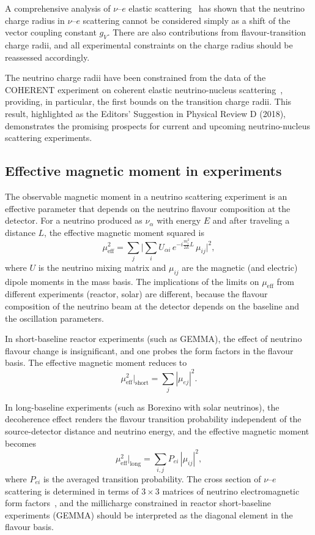 \documentclass[a4paper,11pt]{article}
\begin{document}
A comprehensive analysis of $\nu$--$e$ elastic scattering~\cite{Kouzakov:Studenikin:2017PRD} has shown that the neutrino charge radius in $\nu$--$e$ scattering cannot be considered simply as a shift of the vector coupling constant $g_V$. There are also contributions from flavour-transition charge radii, and all experimental constraints on the charge radius should be reassessed accordingly.

The neutrino charge radii have been constrained from the data of the COHERENT experiment on coherent elastic neutrino-nucleus scattering~\cite{Cadeddu:2018PRD}, providing, in particular, the first bounds on the transition charge radii. This result, highlighted as the Editors' Suggestion in Physical Review D (2018), demonstrates the promising prospects for current and upcoming neutrino-nucleus scattering experiments.

\subsection{Effective magnetic moment in experiments}

The observable magnetic moment in a neutrino scattering experiment is an effective parameter that depends on the neutrino flavour composition at the detector. For a neutrino produced as $\nu_\alpha$ with energy $E$ and after traveling a distance $L$, the effective magnetic moment squared is~\cite{Kouzakov:Studenikin:2017PRD}
\begin{equation}
\label{eq:mu_eff}
\mu_{\text{eff}}^2 = \sum_j \bigg|\sum_i U_{\alpha i}\,e^{-i\frac{m_i^2}{2E}L}\,\mu_{ij}\bigg|^2,
\end{equation}
where $U$ is the neutrino mixing matrix and $\mu_{ij}$ are the magnetic (and electric) dipole moments in the mass basis. The implications of the limits on $\mu_{\text{eff}}$ from different experiments (reactor, solar) are different, because the flavour composition of the neutrino beam at the detector depends on the baseline and the oscillation parameters.

In short-baseline reactor experiments (such as GEMMA), the effect of neutrino flavour change is insignificant, and one probes the form factors in the flavour basis. The effective magnetic moment reduces to
\begin{equation}
\mu_{\text{eff}}^2 \big|_{\text{short}} = \sum_j |\mu_{ej}|^2.
\end{equation}

In long-baseline experiments (such as Borexino with solar neutrinos), the decoherence effect renders the flavour transition probability independent of the source-detector distance and neutrino energy, and the effective magnetic moment becomes
\begin{equation}
\mu_{\text{eff}}^2 \big|_{\text{long}} = \sum_{i,j} P_{e i}\,|\mu_{ij}|^2,
\end{equation}
where $P_{ei}$ is the averaged transition probability. The cross section of $\nu$--$e$ scattering is determined in terms of $3\times 3$ matrices of neutrino electromagnetic form factors~\cite{Kouzakov:Studenikin:2017PRD}, and the millicharge constrained in reactor short-baseline experiments (GEMMA) should be interpreted as the diagonal element in the flavour basis.
\end{document}
